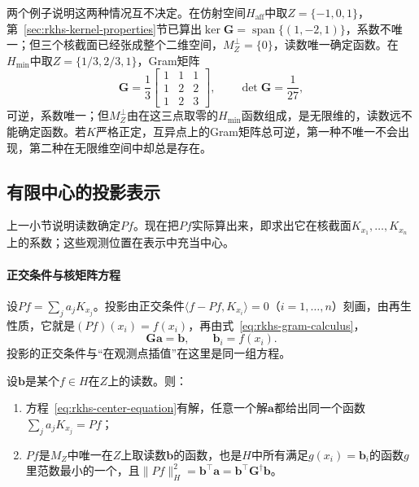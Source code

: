两个例子说明这两种情况互不决定。在仿射空间$H_{\mathrm{aff}}$中取$Z=\{-1,0,1\}$，第~\ref{sec:rkhs-kernel-properties}节已算出$\ker\bm G=\operatorname{span}\{(1,-2,1)\}$，系数不唯一；但三个核截面已经张成整个二维空间，$M_Z^\perp=\{0\}$，读数唯一确定函数。在$H_{\min}$中取$Z=\{1/3,2/3,1\}$，Gram矩阵
\[
\bm G=\frac13\begin{bmatrix}1&1&1\\1&2&2\\1&2&3\end{bmatrix},\qquad
\det\bm G=\frac1{27},
\]
可逆，系数唯一；但$M_Z^\perp$由在这三点取零的$H_{\min}$函数组成，是无限维的，读数远不能确定函数。若$K$严格正定，互异点上的Gram矩阵总可逆，第一种不唯一不会出现，第二种在无限维空间中却总是存在。

\subsection{有限中心的投影表示}
\label{sec:rkhs-center-projection}

上一小节说明读数确定$Pf$。现在把$Pf$实际算出来，即求出它在核截面$K_{x_1},\ldots,K_{x_n}$上的系数；这些观测位置在表示中充当中心。

\paragraph{正交条件与核矩阵方程}

设$Pf=\sum_ja_jK_{x_j}$。投影由正交条件$\langle f-Pf,K_{x_i}\rangle=0$（$i=1,\ldots,n$）刻画，由再生性质，它就是$(Pf)(x_i)=f(x_i)$，再由式~\eqref{eq:rkhs-gram-calculus}，
\begin{equation}
\bm G\bm a=\bm b,\qquad \bm b_i=f(x_i).
\label{eq:rkhs-center-equation}
\end{equation}
投影的正交条件与“在观测点插值”在这里是同一组方程。

\begin{theorem}[有限中心的投影]
\label{thm:rkhs-center-projection}
设$\bm b$是某个$f\in H$在$Z$上的读数。则：
\begin{enumerate}
\item 方程~\eqref{eq:rkhs-center-equation}有解，任意一个解$\bm a$都给出同一个函数$\sum_ja_jK_{x_j}=Pf$；
\item $Pf$是$M_Z$中唯一在$Z$上取读数$\bm b$的函数，也是$H$中所有满足$g(x_i)=\bm b_i$的函数$g$里范数最小的一个，且$\|Pf\|_H^2=\bm b^{\top}\bm a=\bm b^{\top}\bm G^{\dagger}\bm b$。
\end{enumerate}
\end{theorem}

